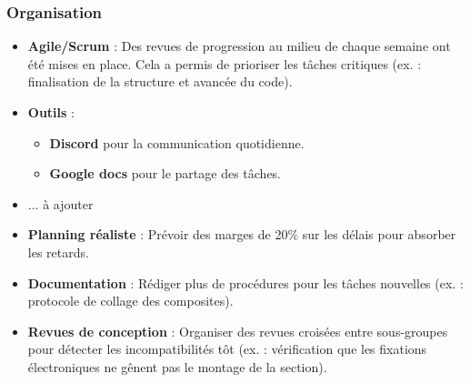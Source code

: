 \subsubsection{Organisation}
\begin{itemize}
    \item \textbf{Agile/Scrum} : Des revues de progression au milieu de chaque semaine ont été mises en place. Cela a permis de prioriser les tâches critiques (ex. : finalisation de la structure et avancée du code).
    \item \textbf{Outils} :
    \begin{itemize}
        \item \textbf{Discord} pour la communication quotidienne.
        \item \textbf{Google docs} pour le partage des tâches.
    \end{itemize}
\end{itemize}

\begin{itemize}
    \item ... à ajouter 
\end{itemize}

\begin{itemize}
    \item \textbf{Planning réaliste} : Prévoir des marges de 20\% sur les délais pour absorber les retards.
    \item \textbf{Documentation} : Rédiger plus de procédures pour les tâches nouvelles (ex. : protocole de collage des composites).
    \item \textbf{Revues de conception} : Organiser des revues croisées entre sous-groupes pour détecter les incompatibilités tôt (ex. : vérification que les fixations électroniques ne gênent pas le montage de la section).
\end{itemize}
